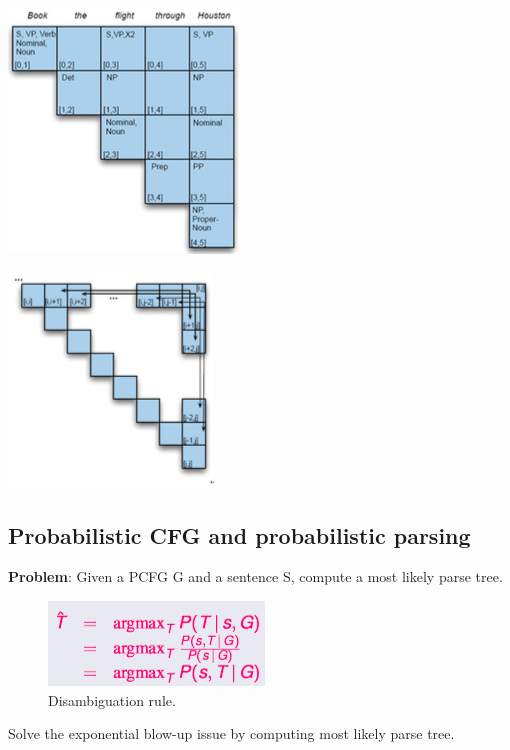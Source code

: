 \noindent
\begin{minipage}{.5\textwidth}
	\centering
	\includegraphics[scale=0.6]{images/48_table.png}
\end{minipage}%
\begin{minipage}{.5\textwidth}
	\centering
	\includegraphics[scale=0.6]{images/49_order.png}
\end{minipage}


\subsection{Probabilistic CFG and probabilistic parsing}

\textbf{Problem}: Given a PCFG G and a sentence S, compute a most likely parse tree.

\begin{figure}[htp]
	\centering
	\includegraphics[scale=0.6]{images/54_prob.png}
 	\caption{Disambiguation rule.}
\end{figure}

Solve the exponential blow-up issue by computing most likely parse tree.

